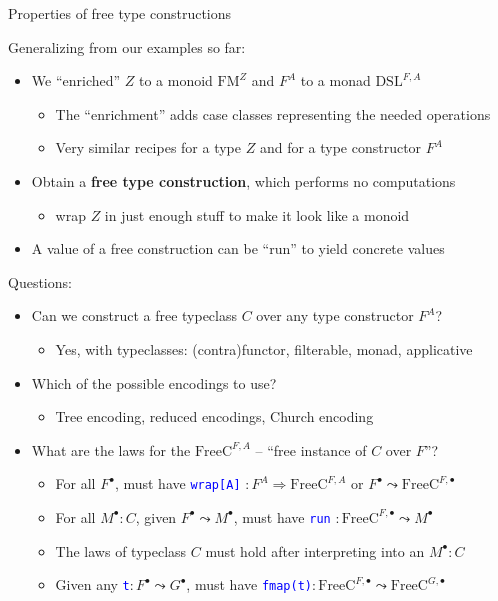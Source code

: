 \documentclass[english,,russian]{beamer}
\begin{document}
\begin{frame}{Properties of free type constructions}

Generalizing from our examples so far:
\begin{itemize}
\item We ``enriched'' $Z$ to a monoid $\text{FM}^{Z}$ and $F^{A}$ to
a monad $\text{DSL}^{F,A}$ 
\begin{itemize}
\item The ``enrichment'' adds case classes representing the needed operations
\item Very similar recipes for a type $Z$ and for a type constructor $F^{A}$
\end{itemize}
\item Obtain a \textbf{free type construction}, which performs no computations
\begin{itemize}
\item wrap $Z$ in just enough stuff to make it look like a monoid
\end{itemize}
\item A value of a free construction can be ``run'' to yield concrete
values 
\end{itemize}
Questions:
\begin{itemize}
\item Can we construct a free typeclass $C$ over any type constructor $F^{A}$?
\begin{itemize}
\item Yes, with typeclasses: (contra)functor, filterable, monad, applicative
\end{itemize}
\item Which of the possible encodings to use?
\begin{itemize}
\item Tree encoding, reduced encodings, Church encoding
\end{itemize}
\item What are the laws for the $\text{FreeC}^{F,A}$ -- ``free instance
of $C$ over $F$''?
\begin{itemize}
\item For all $F^{\bullet}$, must have \texttt{\textcolor{blue}{\footnotesize{}wrap{[}A{]}}}
$:F^{A}\Rightarrow\text{FreeC}^{F,A}$ or $F^{\bullet}\leadsto\text{FreeC}^{F,\bullet}$
\item For all $M^{\bullet}:C$, given $F^{\bullet}\leadsto M^{\bullet}$,
must have \texttt{\textcolor{blue}{\footnotesize{}run}} $:\text{FreeC}^{F,\bullet}\leadsto M^{\bullet}$
\item The laws of typeclass $C$ must hold after interpreting into an $M^{\bullet}:C$
\item Given any \texttt{\textcolor{blue}{\footnotesize{}t}}$:F^{\bullet}\leadsto G^{\bullet}$,
must have \texttt{\textcolor{blue}{\footnotesize{}fmap(t)}}$:\text{FreeC}^{F,\bullet}\leadsto\text{FreeC}^{G,\bullet}$
\end{itemize}
\end{itemize}
\end{frame}
\end{document}
